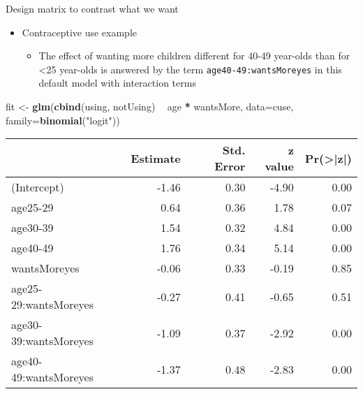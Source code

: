 \documentclass[
  ignorenonframetext,
]{beamer}
\newenvironment{Shaded}{\begin{snugshade}}{\end{snugshade}}
\newcommand{\DataTypeTok}[1]{\textcolor[rgb]{0.13,0.29,0.53}{#1}}
\newcommand{\KeywordTok}[1]{\textcolor[rgb]{0.13,0.29,0.53}{\textbf{#1}}}
\newcommand{\NormalTok}[1]{#1}
\newcommand{\OperatorTok}[1]{\textcolor[rgb]{0.81,0.36,0.00}{\textbf{#1}}}
\newcommand{\StringTok}[1]{\textcolor[rgb]{0.31,0.60,0.02}{#1}}
\providecommand{\tightlist}{%
  \setlength{\itemsep}{0pt}\setlength{\parskip}{0pt}}
\begin{document}
\begin{frame}[fragile]{Design matrix to contrast what we want}
\protect\hypertarget{design-matrix-to-contrast-what-we-want}{}

\begin{itemize}
\tightlist
\item
  Contraceptive use example

  \begin{itemize}
  \tightlist
  \item
    The effect of wanting more children different for 40-49 year-olds
    than for \textless25 year-olds is answered by the term
    \texttt{age40-49:wantsMoreyes} in this default model with
    interaction terms
  \end{itemize}
\end{itemize}

\begin{Shaded}
\begin{Highlighting}[]
\NormalTok{fit <-}\StringTok{ }\KeywordTok{glm}\NormalTok{(}\KeywordTok{cbind}\NormalTok{(using, notUsing) }\OperatorTok{~}\StringTok{ }\NormalTok{age }\OperatorTok{*}\StringTok{ }\NormalTok{wantsMore, }
           \DataTypeTok{data=}\NormalTok{cuse, }\DataTypeTok{family=}\KeywordTok{binomial}\NormalTok{(}\StringTok{"logit"}\NormalTok{))}
\end{Highlighting}
\end{Shaded}

\tiny
\begin{table}[H]
\centering
\begin{tabular}[t]{l|r|r|r|r}
\hline
  & Estimate & Std. Error & z value & Pr(>|z|)\\
\hline
(Intercept) & -1.46 & 0.30 & -4.90 & 0.00\\
\hline
age25-29 & 0.64 & 0.36 & 1.78 & 0.07\\
\hline
age30-39 & 1.54 & 0.32 & 4.84 & 0.00\\
\hline
age40-49 & 1.76 & 0.34 & 5.14 & 0.00\\
\hline
wantsMoreyes & -0.06 & 0.33 & -0.19 & 0.85\\
\hline
age25-29:wantsMoreyes & -0.27 & 0.41 & -0.65 & 0.51\\
\hline
age30-39:wantsMoreyes & -1.09 & 0.37 & -2.92 & 0.00\\
\hline
age40-49:wantsMoreyes & -1.37 & 0.48 & -2.83 & 0.00\\
\hline
\end{tabular}
\end{table}

\end{frame}
\end{document}
